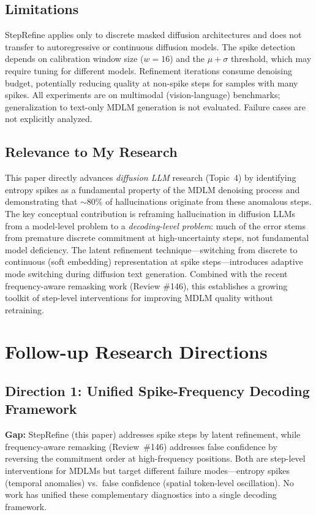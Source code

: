 \documentclass[11pt,a4paper]{article}
\begin{document}
\subsection{Limitations}
StepRefine applies only to discrete masked diffusion architectures and does not transfer to autoregressive or continuous diffusion models. The spike detection depends on calibration window size ($w{=}16$) and the $\mu + \sigma$ threshold, which may require tuning for different models. Refinement iterations consume denoising budget, potentially reducing quality at non-spike steps for samples with many spikes. All experiments are on multimodal (vision-language) benchmarks; generalization to text-only MDLM generation is not evaluated. Failure cases are not explicitly analyzed.

\subsection{Relevance to My Research}
This paper directly advances \emph{diffusion LLM} research (Topic~4) by identifying entropy spikes as a fundamental property of the MDLM denoising process and demonstrating that $\sim$80\% of hallucinations originate from these anomalous steps. The key conceptual contribution is reframing hallucination in diffusion LLMs from a model-level problem to a \emph{decoding-level problem}: much of the error stems from premature discrete commitment at high-uncertainty steps, not fundamental model deficiency. The latent refinement technique---switching from discrete to continuous (soft embedding) representation at spike steps---introduces adaptive mode switching during diffusion text generation. Combined with the recent frequency-aware remasking work (Review \#146), this establishes a growing toolkit of step-level interventions for improving MDLM quality without retraining.

\section{Follow-up Research Directions}

\subsection{Direction 1: Unified Spike-Frequency Decoding Framework}
\textbf{Gap:} StepRefine (this paper) addresses spike steps by latent refinement, while frequency-aware remasking (Review~\#146) addresses false confidence by reversing the commitment order at high-frequency positions. Both are step-level interventions for MDLMs but target different failure modes---entropy spikes (temporal anomalies) vs.\ false confidence (spatial token-level oscillation). No work has unified these complementary diagnostics into a single decoding framework.
\end{document}
